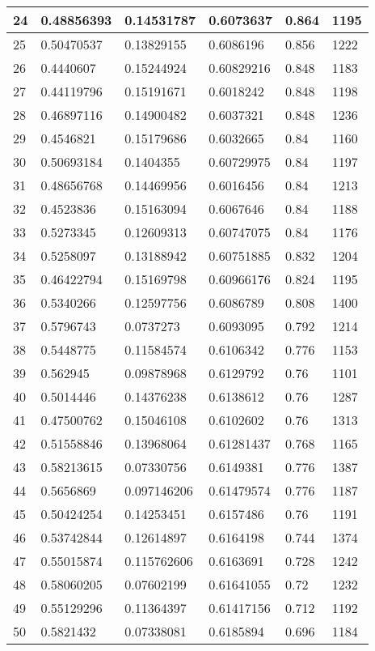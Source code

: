 \begin{longtable}{|l|l|l|l|l|l|}
24 & 0.48856393 & 0.14531787 & 0.6073637 & 0.864 & 1195 \\ \hline 
25 & 0.50470537 & 0.13829155 & 0.6086196 & 0.856 & 1222 \\ \hline 
26 & 0.4440607 & 0.15244924 & 0.60829216 & 0.848 & 1183 \\ \hline 
27 & 0.44119796 & 0.15191671 & 0.6018242 & 0.848 & 1198 \\ \hline 
28 & 0.46897116 & 0.14900482 & 0.6037321 & 0.848 & 1236 \\ \hline 
29 & 0.4546821 & 0.15179686 & 0.6032665 & 0.84 & 1160 \\ \hline 
30 & 0.50693184 & 0.1404355 & 0.60729975 & 0.84 & 1197 \\ \hline 
31 & 0.48656768 & 0.14469956 & 0.6016456 & 0.84 & 1213 \\ \hline 
32 & 0.4523836 & 0.15163094 & 0.6067646 & 0.84 & 1188 \\ \hline 
33 & 0.5273345 & 0.12609313 & 0.60747075 & 0.84 & 1176 \\ \hline 
34 & 0.5258097 & 0.13188942 & 0.60751885 & 0.832 & 1204 \\ \hline 
35 & 0.46422794 & 0.15169798 & 0.60966176 & 0.824 & 1195 \\ \hline 
36 & 0.5340266 & 0.12597756 & 0.6086789 & 0.808 & 1400 \\ \hline 
37 & 0.5796743 & 0.0737273 & 0.6093095 & 0.792 & 1214 \\ \hline 
38 & 0.5448775 & 0.11584574 & 0.6106342 & 0.776 & 1153 \\ \hline 
39 & 0.562945 & 0.09878968 & 0.6129792 & 0.76 & 1101 \\ \hline 
40 & 0.5014446 & 0.14376238 & 0.6138612 & 0.76 & 1287 \\ \hline 
41 & 0.47500762 & 0.15046108 & 0.6102602 & 0.76 & 1313 \\ \hline 
42 & 0.51558846 & 0.13968064 & 0.61281437 & 0.768 & 1165 \\ \hline 
43 & 0.58213615 & 0.07330756 & 0.6149381 & 0.776 & 1387 \\ \hline 
44 & 0.5656869 & 0.097146206 & 0.61479574 & 0.776 & 1187 \\ \hline 
45 & 0.50424254 & 0.14253451 & 0.6157486 & 0.76 & 1191 \\ \hline 
46 & 0.53742844 & 0.12614897 & 0.6164198 & 0.744 & 1374 \\ \hline 
47 & 0.55015874 & 0.115762606 & 0.6163691 & 0.728 & 1242 \\ \hline 
48 & 0.58060205 & 0.07602199 & 0.61641055 & 0.72 & 1232 \\ \hline 
49 & 0.55129296 & 0.11364397 & 0.61417156 & 0.712 & 1192 \\ \hline 
50 & 0.5821432 & 0.07338081 & 0.6185894 & 0.696 & 1184 \\ \hline 
\end{longtable}